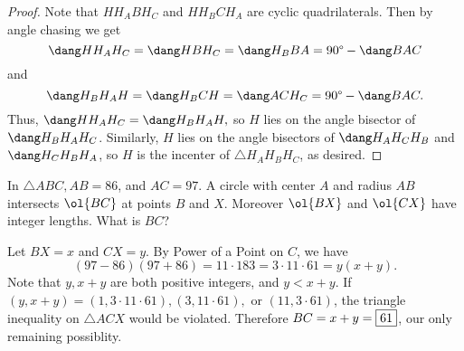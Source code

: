 \documentclass[letterpaper,oneside]{scrartcl}
\begin{document}
\begin{proof}
  Note that \(HH_ABH_C\) and \(HH_BCH_A\) are cyclic quadrilaterals. Then by angle chasing we get
  \[\dang HH_AH_C = \dang HBH_C = \dang H_BBA = 90\degree - \dang BAC\]
  and
  \[\dang H_BH_AH = \dang H_BCH = \dang ACH_C = 90\degree - \dang BAC.\]
  Thus, \(\dang HH_AH_C = \dang H_BH_AH,\) so \(H\) lies on the angle bisector of \(\dang H_BH_AH_C\). Similarly, \(H\) lies on the angle bisectors of \(\dang H_AH_CH_B\) and \(\dang H_CH_BH_A\), so \(H\) is the incenter of \(\triangle H_AH_BH_C\), as desired.
\end{proof}
\begin{problem*}
   In \(\triangle ABC, AB = 86\), and \(AC = 97\). A circle with center \(A\) and radius \(AB\) intersects \(\ol{BC}\) at points \(B\) and \(X\). Moreover \(\ol{BX}\) and \(\ol{CX}\) have integer lengths. What is \(BC\)?
\end{problem*}
\begin{soln}
  Let \(BX = x\) and \(CX = y\). By Power of a Point on \(C\), we have 
  \[(97-86)(97+86) = 11\cdot183 = 3\cdot11\cdot61=y(x+y).\]
  Note that \(y,x+y\) are both positive integers, and \(y<x+y\). If \((y,x+y) = (1,3\cdot11\cdot61),(3,11\cdot61),\) or \((11,3\cdot61)\), the triangle inequality on \(\triangle ACX\) would be violated. Therefore \(BC = x+y = \fbox{61}\), our only remaining possiblity.
\end{soln}
\end{document}
